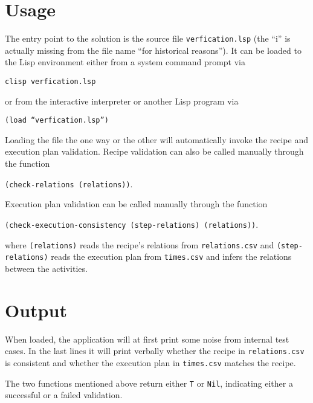  \section{Usage}
    
    The entry point to the solution is the source file \texttt{verfication.lsp}
    (the ``i'' is actually missing from the file name ``for historical
    reasons'').
    It can be loaded to the Lisp environment either from a system command prompt
    via
    
    \begin{center}
        \texttt{clisp verfication.lsp}
    \end{center}
    
    or from the interactive interpreter or another Lisp program via
    
    \begin{center}\texttt{(load ``verfication.lsp'')}\end{center}
    
    Loading the file the one way or the other will automatically invoke the recipe
    and execution plan validation. Recipe validation can also be called manually
    through the function 
    
    \begin{center}\texttt{(check-relations (relations))}.\end{center}
    
    Execution plan
    validation can be called manually through the function
    
    \begin{center}\texttt{(check-execution-consistency (step-relations)
    (relations))}.\end{center}
    
    where \texttt{(relations)} reads the recipe's relations from
    \texttt{relations.csv} and \texttt{(step-relations)} reads the execution
    plan from \texttt{times.csv} and infers the relations between the
    activities.
  
  \section{Output}
    
    When loaded, the application will at first print some noise from internal
    test cases.
    In the last lines it will print verbally whether the recipe in
    \texttt{relations.csv} is consistent and whether the execution plan in
    \texttt{times.csv} matches the recipe.
    
    The two functions mentioned above return either \texttt{T} or \texttt{Nil},
    indicating either a successful or a failed validation.
